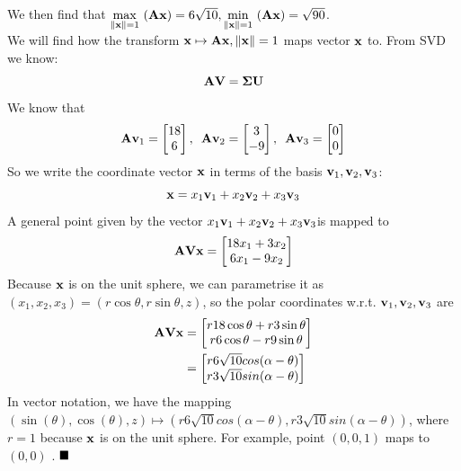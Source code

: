 \documentclass[a4paper]{article}
\numberwithin{equation}{section} %
\newcounter{example}
\newcommand{\norm}[1] {\lVert #1 \rVert} %
\newcommand{\qedblack}{$\hfill\blacksquare$} %
\newcommand{\hquad}{\hskip0.5em\relax}%
\newcommand{\B}[1]{\textbf{\textup{#1}}} %
\begin{document}
\begin{TheSolution}
We then find that $\underset{\left\| \B{x} \right\|=1}{\mathop{\max }}\,\left( \B{Ax}\right)=6\sqrt{10},\underset{\left\| \B{x} \right\|=1}{\mathop{\min }}\,\left( \B{Ax} \right)=\sqrt{90}$.\\
We will find how the transform $\B{x} \mapsto \B{Ax},\norm{\B{x}}=1$ maps vector $\B{x}$ to. From SVD we know:
\[
\B{A}\B{V}=\boldsymbol{\Sigma}\B{U}
\]
We know that
\[
\begin{gathered}
\B{A}\B{v}_1=\begin{bmatrix}18 \\ 6 \end{bmatrix} , \hquad
\B{A}\B{v}_2=\begin{bmatrix}3 \\ -9 \end{bmatrix}, \hquad
\B{A}\B{v}_3=\begin{bmatrix}0 \\ 0\end{bmatrix} 
\end{gathered}
\]
So we write the coordinate vector $\B{x}$ in terms of the basis $\B{v}_1,\B{v}_2,\B{v}_3$:
\[
\B{x}=x_1\B{v}_1 + x_2\B{v}_2 + x_3\B{v}_3
\]
A general point given by the vector $x_1\B{v}_1+x_2\B{v}_2+x_3\B{v}_3$is mapped to
\[
\B{A}\B{V}\B{x}=\begin{bmatrix}18x_1+3x_2\\6x_1-9x_2 \end{bmatrix}
\]
Because $\B{x}$ is on the unit sphere, we can parametrise it as $(x_1,x_2,x_3)=(r\cos \theta, r\sin \theta,z)$, so the polar coordinates w.r.t. $\B{v}_1,\B{v}_2,\B{v}_3$ are
\[
\begin{split}
\B{A}\B{V}\B{x}&=\begin{bmatrix}r18\cos\theta+r3\sin\theta\\r6\cos\theta-r9\sin\theta \end{bmatrix} \\
&= \begin{bmatrix}r6\sqrt{10}cos(\alpha-\theta)\\ r3\sqrt{10}sin(\alpha-\theta) \end{bmatrix}
\end{split}
\]
In vector notation, we have the mapping $\left(\sin(\theta),\cos(\theta),z\right) \mapsto \left(r6\sqrt{10}cos(\alpha-\theta), r3\sqrt{10}sin(\alpha-\theta)\right)$, where $r=1$ because $\B{x}$ is on the unit sphere. For example, point $(0,0,1)$ maps to $(0,0)$ \cite{stackexch_svd_geo}.
\qedblack
\end{TheSolution}
\end{document}
